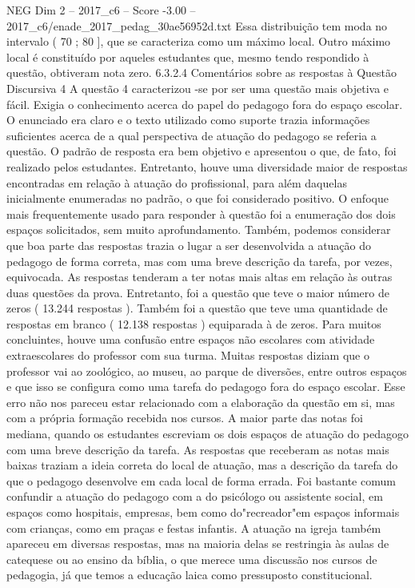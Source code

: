 \begin{textsample}{NEG Dim 2 – 2017\_c6 – Score -3.00 – 2017\_c6/enade\_2017\_pedag\_30ae56952d.txt}
Essa distribuição tem moda no intervalo ( 70 ; 80 ], que se caracteriza como um máximo local.
Outro máximo local é constituído por aqueles estudantes que, mesmo tendo respondido à questão, obtiveram nota zero. 6.3.2.4 Comentários sobre as respostas à Questão Discursiva 4 A questão 4 caracterizou -se por ser uma questão mais objetiva e fácil.
Exigia o conhecimento acerca do papel do pedagogo fora do espaço escolar.
O enunciado era claro e o texto utilizado como suporte trazia informações suficientes acerca de a qual perspectiva de atuação do pedagogo se referia a questão.
O padrão de resposta era bem objetivo e apresentou o que, de fato, foi realizado pelos estudantes.
Entretanto, houve uma diversidade maior de respostas encontradas em relação à atuação do profissional, para além daquelas inicialmente enumeradas no padrão, o que foi considerado positivo.
O enfoque mais frequentemente usado para responder à questão foi a enumeração dos dois espaços solicitados, sem muito aprofundamento.
Também, podemos considerar que boa parte das respostas trazia o lugar a ser desenvolvida a atuação do pedagogo de forma correta, mas com uma breve descrição da tarefa, por vezes, equivocada.
As respostas tenderam a ter notas mais altas em relação às outras duas questões da prova.
Entretanto, foi a questão que teve o maior número de zeros ( 13.244 respostas ).
Também foi a questão que teve uma quantidade de respostas em branco ( 12.138 respostas ) equiparada à de zeros.
Para muitos concluintes, houve uma confusão entre espaços não escolares com atividade extraescolares do professor com sua turma.
Muitas respostas diziam que o professor vai ao zoológico, ao museu, ao parque de diversões, entre outros espaços e que isso se configura como uma tarefa do pedagogo fora do espaço escolar.
Esse erro não nos pareceu estar relacionado com a elaboração da questão em si, mas com a própria formação recebida nos cursos.
A maior parte das notas foi mediana, quando os estudantes escreviam os dois espaços de atuação do pedagogo com uma breve descrição da tarefa.
As respostas que receberam as notas mais baixas traziam a ideia correta do local de atuação, mas a descrição da tarefa do que o pedagogo desenvolve em cada local de forma errada.
Foi bastante comum confundir a atuação do pedagogo com a do psicólogo ou assistente social, em espaços como hospitais, empresas, bem como do"recreador"em espaços informais com crianças, como em praças e festas infantis.
A atuação na igreja também apareceu em diversas respostas, mas na maioria delas se restringia às aulas de catequese ou ao ensino da bíblia, o que merece uma discussão nos cursos de pedagogia, já que temos a educação laica como pressuposto constitucional.

\end{textsample}
